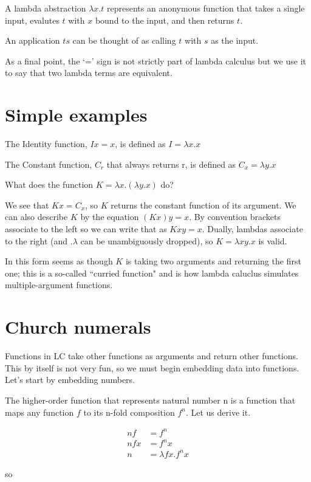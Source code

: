 \documentclass{article}
\begin{document}
A lambda abstraction $\lambda x.t$ represents an anonymous function that takes a single input, evalutes $t$ with $x$ bound to the input, and then returns $t$. 

An application $ts$ can be thought of as calling $t$ with $s$ as the input.

As a final point, the `=' sign is not strictly part of lambda calculus but we use it to say that two lambda terms are equivalent.

\section{Simple examples}

The Identity function, $Ix = x$, is defined as $I = \lambda x.x$

The Constant function, $C_r$ that always returns r, is defined as $C_x = \lambda y.x$

What does the function $K = \lambda x.(\lambda y.x)$ do?

We see that $Kx = C_x$, so $K$ returns the constant function of its argument. We can also describe $K$ by the equation $(Kx)y = x$. By convention brackets associate to the left so we can write that as $Kxy = x$. Dually, lambdas associate to the right (and $.\lambda$ can be unambiguously dropped), so $K = \lambda xy.x$ is valid.

In this form seems as though $K$ is taking two arguments and returning the first one; this is a so-called ``curried function" and is how lambda caluclus simulates multiple-argument functions.

\section{Church numerals}

Functions in LC take other functions as arguments and return other functions. This by itself is not very fun, so we must begin embedding data into functions. Let's start by embedding numbers.

The higher-order function that represents natural number n is a function that maps any function $f$ to its n-fold composition $f^n$. Let us derive it.

\begin{align}
nf &= f^n \\
nfx &= f^nx \\
n &= \lambda fx.f^n x
\end{align}

so
\end{document}
